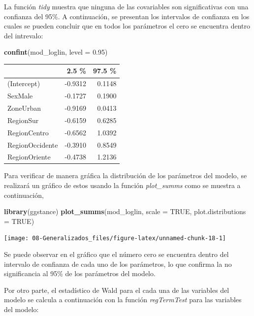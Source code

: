 \documentclass[
  12pt,
]{book}
\newenvironment{Shaded}{\begin{snugshade}}{\end{snugshade}}
\newcommand{\AttributeTok}[1]{\textcolor[rgb]{0.13,0.29,0.53}{#1}}
\newcommand{\ConstantTok}[1]{\textcolor[rgb]{0.56,0.35,0.01}{#1}}
\newcommand{\FloatTok}[1]{\textcolor[rgb]{0.00,0.00,0.81}{#1}}
\newcommand{\FunctionTok}[1]{\textcolor[rgb]{0.13,0.29,0.53}{\textbf{#1}}}
\newcommand{\NormalTok}[1]{#1}
\begin{document}
La función \emph{tidy} muestra que ninguna de las covariables son significativas con una confianza del 95\%. A continuación, se presentan los intervalos de confianza en los cuales se pueden concluir que en todos los parámetros el cero se encuentra dentro del intrevalo:

\begin{Shaded}
\begin{Highlighting}[]
\FunctionTok{confint}\NormalTok{(mod\_loglin, }\AttributeTok{level =} \FloatTok{0.95}\NormalTok{) }
\end{Highlighting}
\end{Shaded}

\begin{tabular}{l|r|r}
\hline
  & 2.5 \% & 97.5 \%\\
\hline
(Intercept) & -0.9312 & 0.1148\\
\hline
SexMale & -0.1727 & 0.1900\\
\hline
ZoneUrban & -0.9169 & 0.0413\\
\hline
RegionSur & -0.6159 & 0.6285\\
\hline
RegionCentro & -0.6562 & 1.0392\\
\hline
RegionOccidente & -0.3910 & 0.8549\\
\hline
RegionOriente & -0.4738 & 1.2136\\
\hline
\end{tabular}

Para verificar de manera gráfica la distribución de los parámetros del modelo, se realizará un gráfico de estos usando la función \emph{plot\_summs} como se muestra a continuación,

\begin{Shaded}
\begin{Highlighting}[]
\FunctionTok{library}\NormalTok{(ggstance)}
\FunctionTok{plot\_summs}\NormalTok{(mod\_loglin, }
             \AttributeTok{scale =} \ConstantTok{TRUE}\NormalTok{, }\AttributeTok{plot.distributions =} \ConstantTok{TRUE}\NormalTok{)}
\end{Highlighting}
\end{Shaded}

\texttt{[image: 08-Generalizados\_files/figure-latex/unnamed-chunk-18-1]}

Se puede observar en el gráfico que el número cero se encuentra dentro del intervalo de confianza de cada uno de los parámetros, lo que confirma la no significancia al 95\% de los parámetros del modelo.

Por otro parte, el estadístico de Wald para el cada una de las variables del modelo se calcula a continuación con la función \emph{regTermTest} para las variables del modelo:
\end{document}
